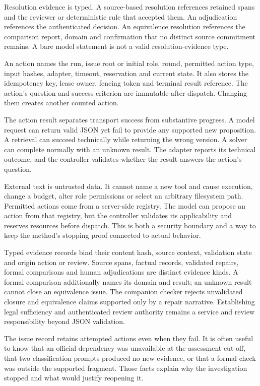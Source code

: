 Resolution evidence is typed. A source-based resolution references retained spans
and the reviewer or deterministic rule that accepted them. An adjudication
references the authenticated decision. An equivalence resolution references the
comparison report, domain and confirmation that no distinct source commitment
remains. A bare model statement is not a valid resolution-evidence type.

An action names the run, issue root or initial role, round, permitted action type,
input hashes, adapter, timeout, reservation and current state. It also stores the
idempotency key, lease owner, fencing token and terminal result reference. The
action's question and success criterion are immutable after dispatch. Changing
them creates another counted action.

The action result separates transport success from substantive progress. A model
request can return valid JSON yet fail to provide any supported new proposition.
A retrieval can succeed technically while returning the wrong version. A solver
can complete normally with an unknown result. The adapter reports its technical
outcome, and the controller validates whether the result answers the action's
question.

External text is untrusted data. It cannot name a new tool and cause execution,
change a budget, alter role permissions or select an arbitrary filesystem path.
Permitted actions come from a server-side registry. The model can propose an
action from that registry, but the controller validates its applicability and
reserves resources before dispatch. This is both a security boundary and a way to
keep the method's stopping proof connected to actual behavior.

Typed evidence records bind their content hash, source context, validation state
and origin action or review. Source spans, factual records, validated repairs,
formal comparisons and human adjudications are distinct evidence kinds. A formal
comparison additionally names its domain and result; an unknown result cannot
close an equivalence issue. The companion checker rejects unvalidated closure
and equivalence claims supported only by a repair narrative. Establishing legal
sufficiency and authenticated review authority remains a service and review
responsibility beyond JSON validation.

The issue record retains attempted actions even when they fail. It is often useful
to know that an official dependency was unavailable at the assessment cut-off,
that two classification prompts produced no new evidence, or that a formal check
was outside the supported fragment. Those facts explain why the investigation
stopped and what would justify reopening it.

